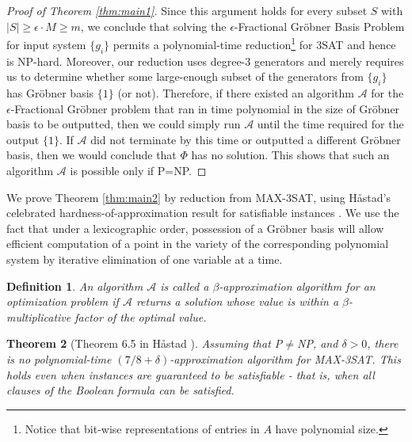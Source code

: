 \documentclass{article}
\newcommand{\A}[0]{\mathcal{A}}
\newcommand{\ep}[0]{\epsilon}
\newtheorem{thm}{Theorem}
\newtheorem{defn}[thm]{Definition}
\begin{document}
\begin{proof}[Proof of Theorem \ref{thm:main1}]
Since this argument holds for every subset $S$ with $|S|\ge \ep\cdot M \ge m$, we conclude that solving the $\ep$\nobreakdash-Fractional Gr\"obner Basis Problem for input system $\{g_i\}$ permits a polynomial-time reduction\footnote{Notice that bit-wise representations of entries in $A$ have polynomial size.} for 3SAT and hence is NP-hard.  Moreover, our reduction uses 
degree-3 generators and merely requires us to determine whether some large-enough subset of the generators from $\{g_i\}$ has Gr\"obner basis $\{1\}$ (or not). Therefore, if there existed an algorithm $\mathcal{A}$ for the $\ep$\nobreakdash-Fractional Gr\"obner problem that ran in time polynomial in the size of Gr\"obner basis to be outputted, then we could simply run $\mathcal{A}$ until the time required for the output $\{1\}$.  If $\mathcal{A}$ did not terminate by this time or outputted a different Gr\"obner basis, then we would conclude that $\Phi$ has no solution.  This shows that such an algorithm $\mathcal{A}$ is possible only if P=NP. 
\end{proof}



We prove Theorem \ref{thm:main2} by reduction from MAX-3SAT, using H{\aa}stad's celebrated hardness-of-approximation result for satisfiable instances \cite{hast01}.  We use the fact that under a lexicographic order, possession of a Gr\"obner basis  will allow efficient computation of a point in the variety of the corresponding polynomial system by iterative elimination of one variable at a time.

\begin{defn}
An algorithm $\A$ is called a \emph{$\beta$\nobreakdash-approximation algorithm} for an optimization problem if $\A$ returns a solution whose value is within a $\beta$-multiplicative factor of the optimal value.
\end{defn}

\begin{thm}[Theorem 6.5 in H{\aa}stad \cite{hast01}] \label{hastad}
Assuming that P$\neq$NP, and $\delta>0$, there is no polynomial-time $(7/8+\delta)$-approximation algorithm for MAX-3SAT.  This holds even when instances are guaranteed to be satisfiable - that is, when \emph{all} clauses of the Boolean formula can be satisfied.
\end{thm}
\end{document}
